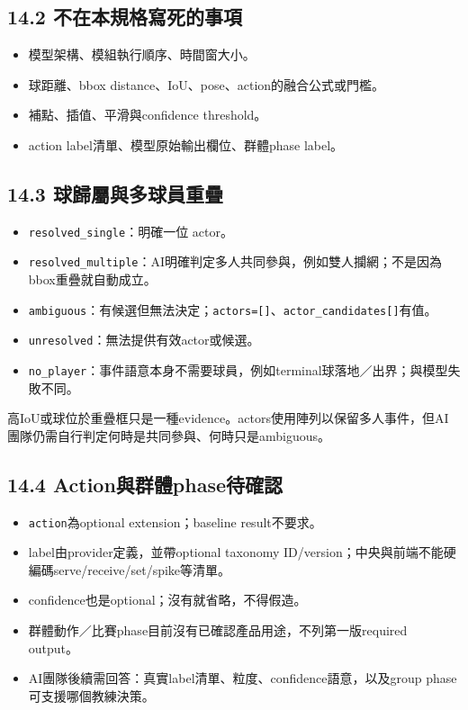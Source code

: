 \documentclass[
  9pt,
  a4paper,
]{article}
\providecommand{\tightlist}{%
  \setlength{\itemsep}{0pt}\setlength{\parskip}{0pt}}
\begin{document}
\subsection{14.2
不在本規格寫死的事項}\label{142-ux4e0dux5728ux672cux898fux683cux5bebux6b7bux7684ux4e8bux9805}

\begin{itemize}
\tightlist
\item
  模型架構、模組執行順序、時間窗大小。
\item
  球距離、bbox distance、IoU、pose、action的融合公式或門檻。
\item
  補點、插值、平滑與confidence threshold。
\item
  action label清單、模型原始輸出欄位、群體phase label。
\end{itemize}

\subsection{14.3
球歸屬與多球員重疊}\label{143-ux7403ux6b78ux5c6cux8207ux591aux7403ux54e1ux91cdux758a}

\begin{itemize}
\tightlist
\item
  \texttt{resolved\_\allowbreak{}single}：明確一位 actor。
\item
  \texttt{resolved\_\allowbreak{}multiple}：AI明確判定多人共同參與，例如雙人攔網；不是因為bbox重疊就自動成立。
\item
  \texttt{ambiguous}：有候選但無法決定；\texttt{actors={[}{]}}、\texttt{actor\_\allowbreak{}candidates{[}{]}}有值。
\item
  \texttt{unresolved}：無法提供有效actor或候選。
\item
  \texttt{no\_\allowbreak{}player}：事件語意本身不需要球員，例如terminal球落地／出界；與模型失敗不同。
\end{itemize}

高IoU或球位於重疊框只是一種evidence。actors使用陣列以保留多人事件，但AI團隊仍需自行判定何時是共同參與、何時只是ambiguous。

\subsection{14.4
Action與群體phase待確認}\label{144-actionux8207ux7fa4ux9ad4phaseux5f85ux78baux8a8d}

\begin{itemize}
\tightlist
\item
  \texttt{action}為optional extension；baseline result不要求。
\item
  label由provider定義，並帶optional taxonomy
  ID/version；中央與前端不能硬編碼serve/receive/set/spike等清單。
\item
  confidence也是optional；沒有就省略，不得假造。
\item
  群體動作／比賽phase目前沒有已確認產品用途，不列第一版required output。
\item
  AI團隊後續需回答：真實label清單、粒度、confidence語意，以及group
  phase可支援哪個教練決策。
\end{itemize}
\end{document}
